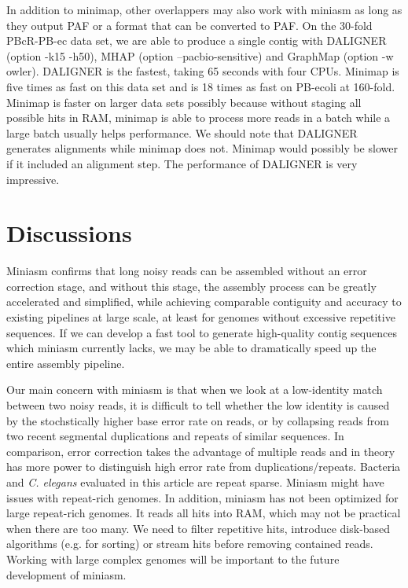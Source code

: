 \documentclass{bioinfo}
\begin{document}
In addition to minimap, other overlappers may also work with miniasm as long as
they output PAF or a format that can be converted to PAF.  On the 30-fold
PBcR-PB-ec data set, we are able to produce a single contig with DALIGNER
(option -k15 -h50), MHAP (option \mbox{--pacbio-sensitive}) and GraphMap
(option -w owler). DALIGNER is the fastest, taking 65 seconds with four CPUs.
Minimap is five times as fast on this data set and is 18 times as fast on
PB-ecoli at 160-fold. Minimap is faster on larger data sets possibly because
without staging all possible hits in RAM, minimap is able to process more reads
in a batch while a large batch usually helps performance. We should note that
DALIGNER generates alignments while minimap does not. Minimap would possibly be
slower if it included an alignment step. The performance of DALIGNER is very
impressive.

\section{Discussions}

Miniasm confirms that long noisy reads can be assembled without an error
correction stage, and without this stage, the assembly process can be greatly
accelerated and simplified, while achieving comparable contiguity and accuracy
to existing pipelines at large scale, at least for genomes without excessive
repetitive sequences. If we can develop a fast tool to generate high-quality
contig sequences which miniasm currently lacks, we may be able to dramatically
speed up the entire assembly pipeline.

Our main concern with miniasm is that when we look at a low-identity match
between two noisy reads, it is difficult to tell whether the low identity is
caused by the stochstically higher base error rate on reads, or by collapsing
reads from two recent segmental duplications and repeats of similar sequences. 
In comparison, error correction takes the advantage of multiple reads and in
theory has more power to distinguish high error rate from duplications/repeats.
Bacteria and {\it C. elegans} evaluated in this article are repeat sparse.
Miniasm might have issues with repeat-rich genomes.  In addition, miniasm has
not been optimized for large repeat-rich genomes. It reads all hits into RAM,
which may not be practical when there are too many. We need to filter
repetitive hits, introduce disk-based algorithms (e.g. for sorting) or stream
hits before removing contained reads. Working with large complex genomes will
be important to the future development of miniasm.
\end{document}
